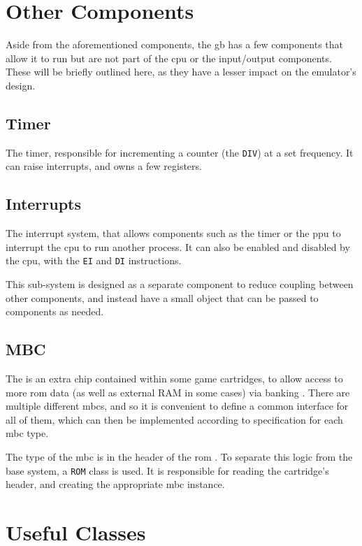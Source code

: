 \documentclass[11pt]{informatics-report}
\begin{document}
\section{Other Components}

Aside from the aforementioned components, the \gls{gb} has a few components that allow it to run but are not part of the \gls{cpu} or the input/output components. These will be briefly outlined here, as they have a lesser impact on the emulator's design.

\subsection{Timer}

The timer, responsible for incrementing a counter (the \texttt{DIV}) at a set frequency. It can raise interrupts, and owns a few registers.

\subsection{Interrupts}

The interrupt system, that allows components such as the timer or the \gls{ppu} to interrupt the \gls{cpu} to run another process. It can also be enabled and disabled by the \gls{cpu}, with the \texttt{EI} and \texttt{DI} instructions.

This sub-system is designed as a separate component to reduce coupling between other components, and instead have a small object that can be passed to components as needed.

\subsection{MBC}

The  is an extra chip contained within some game cartridges, to allow access to more \gls{rom} data (as well as external RAM in some cases) via banking \cite[MBCs]{pandoc}. There are multiple different \glspl{mbc}, and so it is convenient to define a common interface for all of them, which can then be implemented according to specification for each \gls{mbc} type.

The type of the \gls{mbc} is in the header of the \gls{rom} \cite[The Cartridge Header]{pandoc}. To separate this logic from the base system, a \texttt{ROM} class is used. It is responsible for reading the cartridge's header, and creating the appropriate \gls{mbc} instance.

\section{Useful Classes}
\end{document}
